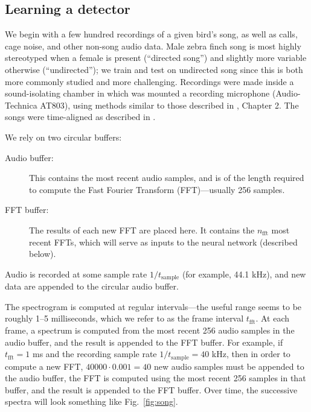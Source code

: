 \documentclass[10pt,letterpaper]{article}
\newcommand\fig[1]{Fig.~\ref{#1}}
\begin{document}
\subsection{Learning a detector}

We begin with a few hundred recordings of a given bird's song, as well
as calls, cage noise, and other non-song audio data.  Male zebra finch
song is most highly stereotyped when a female is present (``directed
song'') and slightly more variable otherwise (``undirected''); we
train and test on undirected song since this is both more commonly
studied and more challenging.  Recordings were made inside a
sound-isolating chamber in which was mounted a recording microphone
(Audio-Technica AT803), using methods similar to those described in
\cite{Tchernichovski2011SAP}, Chapter 2.  The songs were time-aligned
as described in \cite{Poole2012}.

We rely on two circular buffers:
\begin{description}
\item[Audio buffer:] This contains the most recent audio samples, and
  is of the length required to compute the Fast Fourier Transform
  (FFT)---usually 256 samples.
\item[FFT buffer:] The results of each new FFT are placed here.  It
  contains the $n_\textrm{fft}$ most recent FFTs, which will serve as
  inputs to the neural network (described below).
\end{description}

Audio is recorded at some sample rate $1/t_\mathrm{sample}$ (for example, 44.1 kHz), and new data are appended to the circular audio buffer.

The spectrogram is computed at regular intervals---the useful range
seems to be roughly 1--5 milliseconds, which we refer to as the frame
interval $t_\textrm{fft}$.  At each frame, a spectrum is computed from
the most recent 256 audio samples in the audio buffer, and the result
is appended to the FFT buffer.  For example, if $t_\textrm{fft}=1$ ms
and the recording sample rate $1/t_\textrm{sample}=40$ kHz, then in
order to compute a new FFT, $40000\cdot 0.001=40$ new audio samples
must be appended to the audio buffer, the FFT is computed using the
most recent 256 samples in that buffer, and the result is appended to
the FFT buffer.  Over time, the successive spectra will look something
like \fig{fig:song}.
\end{document}
